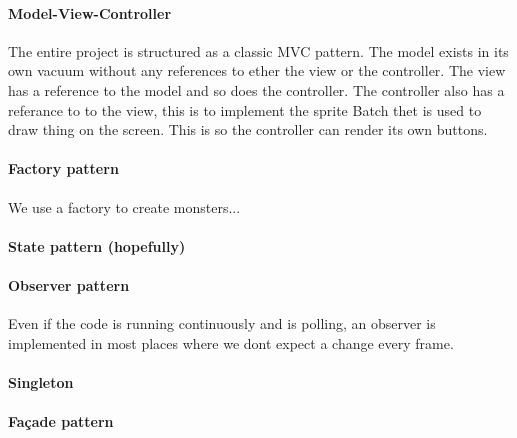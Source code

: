 \paragraph{Model-View-Controller\\}
The entire project is structured as a classic MVC pattern. The model exists in its own vacuum without any references to ether the view or the controller. The view has a reference to the model and so does the controller. The controller also has a referance to to the view, this is to implement the sprite Batch thet is used to draw thing on the screen. This is so the controller can render its own buttons.
\paragraph{Factory pattern\\}
We use a factory to create monsters...
\paragraph{State pattern (hopefully)\\}
\paragraph{Observer pattern\\}
Even if the code is running continuously and is polling, an observer is implemented in most places where we dont expect a change every frame.
\paragraph{Singleton\\}
\paragraph{Façade pattern\\}
